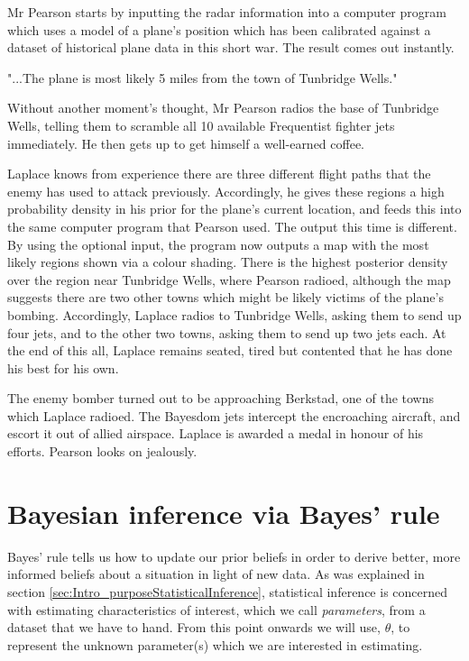 \documentclass[11pt,fullpage]{book}
\begin{document}
Mr Pearson starts by inputting the radar information into a computer program which uses a model of a plane's position which has been calibrated against a dataset of historical plane data in this short war. The result comes out instantly. 

"...The plane is most likely 5 miles from the town of Tunbridge Wells."

Without another moment's thought, Mr Pearson radios the base of Tunbridge Wells, telling them to scramble all 10 available Frequentist fighter jets immediately. He then gets up to get himself a well-earned coffee.

Laplace knows from experience there are three different flight paths that the enemy has used to attack previously. Accordingly, he gives these regions a high probability density in his prior for the plane's current location, and feeds this into the same computer program that Pearson used. The output this time is different. By using the optional input, the program now outputs a map with the most likely regions shown via a colour shading. There is the highest posterior density over the region near Tunbridge Wells, where Pearson radioed, although the map suggests there are two other towns which might be likely victims of the plane's bombing. Accordingly, Laplace radios to Tunbridge Wells, asking them to send up four jets, and to the other two towns, asking them to send up two jets each. At the end of this all, Laplace remains seated, tired but contented that he has done his best for his own.

The enemy bomber turned out to be approaching Berkstad, one of the towns which Laplace radioed. The Bayesdom jets intercept the encroaching aircraft, and escort it out of allied airspace. Laplace is awarded a medal in honour of his efforts. Pearson looks on jealously.

\section{Bayesian inference via Bayes' rule}
Bayes' rule tells us how to update our prior beliefs in order to derive better, more informed beliefs about a situation in light of new data. As was explained in section \ref{sec:Intro_purposeStatisticalInference}, statistical inference is concerned with estimating characteristics of interest, which we call \textit{parameters}, from a dataset that we have to hand. From this point onwards we will use, $\theta$, to represent the unknown parameter(s) which we are interested in estimating. 
\end{document}

